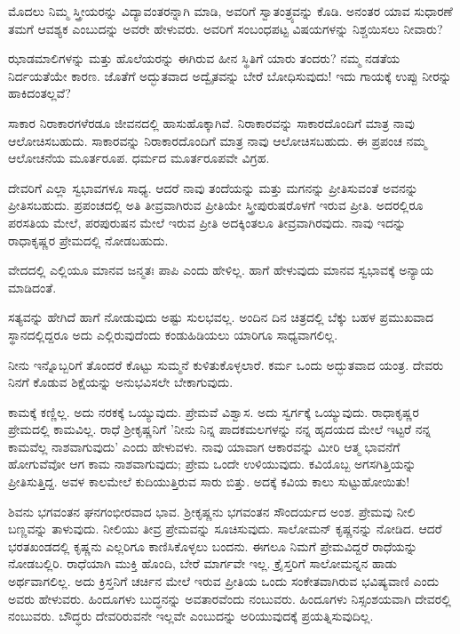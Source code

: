 ಮೊದಲು ನಿಮ್ಮ ಸ್ತ್ರೀಯರನ್ನು ವಿದ್ಯಾವಂತರನ್ನಾಗಿ ಮಾಡಿ, ಅವರಿಗೆ ಸ್ವಾತಂತ್ರ್ಯವನ್ನು ಕೊಡಿ. ಅನಂತರ ಯಾವ ಸುಧಾರಣೆ ತಮಗೆ ಆವಶ್ಯಕ ಎಂಬುದನ್ನು ಅವರೇ ಹೇಳುವರು. ಅವರಿಗೆ ಸಂಬಂಧಪಟ್ಟ ವಿಷಯಗಳನ್ನು ನಿಶ್ಚಯಿಸಲು ನೀವಾರು?

ಝಾಡಮಾಲಿಗಳನ್ನು ಮತ್ತು ಹೊಲೆಯರನ್ನು ಈಗಿರುವ ಹೀನ ಸ್ಥಿತಿಗೆ ಯಾರು ತಂದರು? ನಮ್ಮ ನಡತೆಯ ನಿರ್ದಯತೆಯೇ ಕಾರಣ. ಜೊತೆಗೆ ಅದ್ಭುತವಾದ ಅದ್ವೈತವನ್ನು ಬೇರೆ ಬೋಧಿಸುವುದು! ಇದು ಗಾಯಕ್ಕೆ ಉಪ್ಪು ನೀರನ್ನು ಹಾಕಿದಂತಲ್ಲವೆ?

ಸಾಕಾರ ನಿರಾಕಾರಗಳೆರಡೂ ಜೀವನದಲ್ಲಿ ಹಾಸುಹೊಕ್ಕಾಗಿವೆ. ನಿರಾಕಾರವನ್ನು ಸಾಕಾರದೊಂದಿಗೆ ಮಾತ್ರ ನಾವು ಆಲೋಚಿಸಬಹುದು. ಸಾಕಾರವನ್ನು ನಿರಾಕಾರದೊಂದಿಗೆ ಮಾತ್ರ ನಾವು ಆಲೋಚಿಸಬಹುದು. ಈ ಪ್ರಪಂಚ ನಮ್ಮ ಆಲೋಚನೆಯ ಮೂರ್ತರೂಪ. ಧರ್ಮದ ಮೂರ್ತರೂಪವೇ ವಿಗ್ರಹ.

ದೇವರಿಗೆ ಎಲ್ಲಾ ಸ್ವಭಾವಗಳೂ ಸಾಧ್ಯ. ಆದರೆ ನಾವು ತಂದೆಯನ್ನು ಮತ್ತು ಮಗನನ್ನು ಪ್ರೀತಿಸುವಂತೆ ಅವನನ್ನು ಪ್ರೀತಿಸಬಹುದು. ಪ್ರಪಂಚದಲ್ಲಿ ಅತಿ ತೀವ್ರವಾಗಿರುವ ಪ್ರೀತಿಯೇ ಸ್ತ್ರೀಪುರುಷರೊಳಗೆ ಇರುವ ಪ್ರೀತಿ. ಅದರಲ್ಲಿರೂ ಪರಸತಿಯ ಮೇಲೆ, ಪರಪುರುಷನ ಮೇಲೆ ಇರುವ ಪ್ರೀತಿ ಅದಕ್ಕಿಂತಲೂ ತೀವ್ರವಾಗಿರವುದು. ನಾವು ಇದನ್ನು ರಾಧಾಕೃಷ್ಣರ ಪ್ರೇಮದಲ್ಲಿ ನೋಡಬಹುದು.

ವೇದದಲ್ಲಿ ಎಲ್ಲಿಯೂ ಮಾನವ ಜನ್ಮತಃ ಪಾಪಿ ಎಂದು ಹೇಳಿಲ್ಲ. ಹಾಗೆ ಹೇಳುವುದು ಮಾನವ ಸ್ವಭಾವಕ್ಕೆ ಅನ್ಯಾಯ ಮಾಡಿದಂತೆ.

ಸತ್ಯವನ್ನು ಹೇಗಿದೆ ಹಾಗೆ ನೋಡುವುದು ಅಷ್ಟು ಸುಲಭವಲ್ಲ. ಅಂದಿನ ದಿನ ಚಿತ್ರದಲ್ಲಿ ಬೆಕ್ಕು ಬಹಳ ಪ್ರಮುಖವಾದ ಸ್ಥಾನದಲ್ಲಿದ್ದರೂ ಅದು ಎಲ್ಲಿರುವುದೆಂದು ಕಂಡುಹಿಡಿಯಲು ಯಾರಿಗೂ ಸಾಧ್ಯವಾಗಲಿಲ್ಲ.

ನೀನು ಇನ್ನೊಬ್ಬರಿಗೆ ತೊಂದರೆ ಕೊಟ್ಟು ಸುಮ್ಮನೆ ಕುಳಿತುಕೊಳ್ಳಲಾರೆ. ಕರ್ಮ ಒಂದು ಅದ್ಭುತವಾದ ಯಂತ್ರ. ದೇವರು ನಿನಗೆ ಕೊಡುವ ಶಿಕ್ಷೆಯನ್ನು ಅನುಭವಿಸಲೇ ಬೇಕಾಗುವುದು.

ಕಾಮಕ್ಕೆ ಕಣ್ಣಿಲ್ಲ. ಅದು ನರಕಕ್ಕೆ ಒಯ್ಯುವುದು. ಪ್ರೇಮವೆ ವಿಶ್ವಾಸ. ಅದು ಸ್ವರ್ಗಕ್ಕೆ ಒಯ್ಯುವುದು. ರಾಧಾಕೃಷ್ಣರ ಪ್ರೇಮದಲ್ಲಿ ಕಾಮವಿಲ್ಲ. ರಾಧೆ ಶ‍್ರೀಕೃಷ್ಣನಿಗೆ 'ನೀನು ನಿನ್ನ ಪಾದಕಮಲಗಳನ್ನು ನನ್ನ ಹೃದಯದ ಮೇಲೆ ಇಟ್ಟರೆ ನನ್ನ ಕಾಮವೆಲ್ಲ ನಾಶವಾಗುವುದು' ಎಂದು ಹೇಳುವಳು. ನಾವು ಯಾವಾಗ ಆಕಾರವನ್ನು ಮೀರಿ ಆತ್ಮ ಭಾವನೆಗೆ ಹೋಗುವೆವೋ ಆಗ ಕಾಮ ನಾಶವಾಗುವುದು; ಪ್ರೇಮ ಒಂದೇ ಉಳಿಯುವುದು. ಕವಿಯೊಬ್ಬ ಅಗಸಗಿತ್ತಿಯನ್ನು ಪ್ರೀತಿಸುತ್ತಿದ್ದ. ಅವಳ ಕಾಲಮೇಲೆ ಕುದಿಯುತ್ತಿರುವ ಸಾರು ಬಿತ್ತು. ಅದಕ್ಕೆ ಕವಿಯ ಕಾಲು ಸುಟ್ಟುಹೋಯಿತು!

ಶಿವನು ಭಗವಂತನ ಘನಗಂಭೀರವಾದ ಭಾವ. ಶ‍್ರೀಕೃಷ್ಣನು ಭಗವಂತನ ಸೌಂದರ್ಯದ ಅಂಶ. ಪ್ರೇಮವು ನೀಲಿ ಬಣ್ಣವನ್ನು ತಾಳುವುದು. ನೀಲಿಯು ತೀವ್ರ ಪ್ರೇಮವನ್ನು ಸೂಚಿಸುವುದು. ಸಾಲೋಮನ್ ಕೃಷ್ಣನನ್ನು ನೋಡಿದ. ಆದರೆ ಭರತಖಂಡದಲ್ಲಿ ಕೃಷ್ಣನು ಎಲ್ಲರಿಗೂ ಕಾಣಿಸಿಕೊಳ್ಳಲು ಬಂದನು. ಈಗಲೂ ನಿಮಗೆ ಪ್ರೇಮವಿದ್ದರೆ ರಾಧೆಯನ್ನು ನೋಡಬಲ್ಲಿರಿ. ರಾಧೆಯಾಗಿ ಮುಕ್ತಿ ಹೊಂದಿ, ಬೇರೆ ಮಾರ್ಗವೇ ಇಲ್ಲ. ಕ್ರೈಸ್ತರಿಗೆ ಸಾಲೋಮನ್ನನ ಹಾಡು ಅರ್ಥವಾಗಲಿಲ್ಲ. ಅದು ಕ್ರಿಸ್ತನಿಗೆ ಚರ್ಚಿನ ಮೇಲೆ ಇರುವ ಪ್ರೀತಿಯ ಒಂದು ಸಂಕೇತವಾಗಿರುವ ಭವಿಷ್ಯವಾಣಿ ಎಂದು ಅವರು ಹೇಳುವರು. ಹಿಂದೂಗಳು ಬುದ್ಧನನ್ನು ಅವತಾರವೆಂದು ನಂಬುವರು. ಹಿಂದೂಗಳು ನಿಸ್ಸಂಶಯವಾಗಿ ದೇವರಲ್ಲಿ ನಂಬುವರು. ಬೌದ್ಧರು ದೇವರಿರುವನೇ ಇಲ್ಲವೇ ಎಂಬುದನ್ನು ಅರಿಯುವುದಕ್ಕೆ ಪ್ರಯತ್ನಿಸುವುದಿಲ್ಲ.


